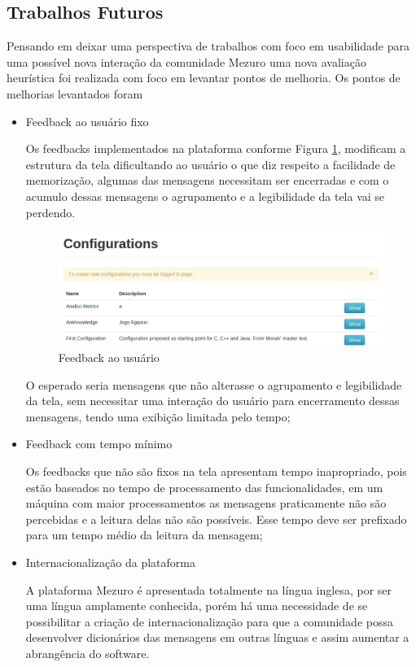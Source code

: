 \subsection{Trabalhos Futuros}
Pensando em deixar uma perspectiva de trabalhos com foco em usabilidade para uma possível nova interação da comunidade Mezuro uma nova avaliação heurística foi realizada com foco em levantar pontos de melhoria. Os pontos de melhorias levantados foram
\begin{itemize}
\item Feedback ao usuário fixo

Os feedbacks implementados na plataforma conforme Figura \ref{feedback}, modificam a estrutura da tela dificultando ao usuário o que diz respeito a facilidade de memorização, algumas das mensagens necessitam ser encerradas e com o acumulo dessas mensagens o agrupamento e a legibilidade da tela vai se perdendo.

\graphicspath{{figuras/}}
\begin{figure}[h]
\centering
\includegraphics[width=1.0\textwidth]{FeedBack}
\caption{Feedback ao usuário}
\label{feedback}
\end{figure}

O esperado seria mensagens que não alterasse o agrupamento e legibilidade da tela, sem necessitar uma interação do usuário para encerramento dessas mensagens, tendo uma exibição limitada pelo tempo;

\item Feedback com tempo mínimo 

Os feedbacks que não são fixos na tela apresentam tempo inapropriado, pois estão baseados no tempo de processamento das funcionalidades, em um máquina com maior processamentos as mensagens praticamente não são percebidas e a leitura delas não são possíveis. Esse tempo deve ser prefixado para um tempo médio da leitura da mensagem;

\item Internacionalização da plataforma

A plataforma Mezuro é apresentada totalmente na língua inglesa, por ser uma língua amplamente conhecida, porém há uma necessidade de se possibilitar a criação de internacionalização para que a comunidade possa desenvolver dicionários das mensagens em outras línguas e assim aumentar a abrangência do software.

\end{itemize}

